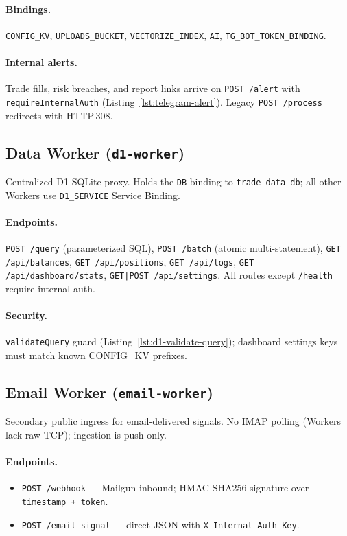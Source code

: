 \paragraph{Bindings.} \texttt{CONFIG\_KV}, \texttt{UPLOADS\_BUCKET}, \texttt{VECTORIZE\_INDEX}, \texttt{AI}, \texttt{TG\_BOT\_TOKEN\_BINDING}.

\paragraph{Internal alerts.} Trade fills, risk breaches, and report links arrive on \texttt{POST /alert} with \texttt{requireInternalAuth} (Listing~\ref{lst:telegram-alert}). Legacy \texttt{POST /process} redirects with HTTP\,308.

\subsection{Data Worker (\texttt{d1-worker})}

Centralized D1 SQLite proxy. Holds the \texttt{DB} binding to \texttt{trade-data-db}; all other Workers use \texttt{D1\_SERVICE} Service Binding.

\paragraph{Endpoints.} \texttt{POST /query} (parameterized SQL), \texttt{POST /batch} (atomic multi-statement), \texttt{GET /api/balances}, \texttt{GET /api/positions}, \texttt{GET /api/logs}, \texttt{GET /api/dashboard/stats}, \texttt{GET|POST /api/settings}. All routes except \texttt{/health} require internal auth.

\paragraph{Security.} \texttt{validateQuery} guard (Listing~\ref{lst:d1-validate-query}); dashboard settings keys must match known CONFIG\_KV prefixes.

\subsection{Email Worker (\texttt{email-worker})}

Secondary public ingress for email-delivered signals. No IMAP polling (Workers lack raw TCP); ingestion is push-only.

\paragraph{Endpoints.}
\begin{itemize}
  \item \texttt{POST /webhook} --- Mailgun inbound; HMAC-SHA256 signature over \texttt{timestamp + token}.
  \item \texttt{POST /email-signal} --- direct JSON with \texttt{X-Internal-Auth-Key}.
\end{itemize}

